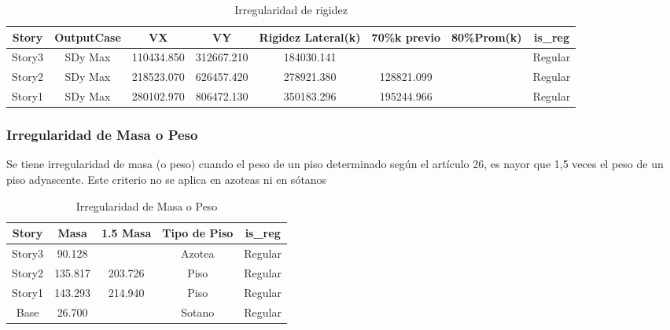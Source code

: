\documentclass{article}%
\begin{document}
%


\begin{table}[h!]%
\centering%
\caption{Irregularidad de rigidez}%
\begin{tabular}{cccccccc}
\toprule
Story & OutputCase & VX & VY & Rigidez Lateral(k) & 70\%k previo & 80\%Prom(k) & is\_reg \\
\midrule
Story3 & SDy Max & 110434.850 & 312667.210 & 184030.141 &  &  & Regular \\
Story2 & SDy Max & 218523.070 & 626457.420 & 278921.380 & 128821.099 &  & Regular \\
Story1 & SDy Max & 280102.970 & 806472.130 & 350183.296 & 195244.966 &  & Regular \\
\bottomrule
\end{tabular}
%
\end{table}

%
\subsubsection{Irregularidad de Masa o Peso}%
\label{ssubsec:IrregularidaddeMasaoPeso}%
\begin{tcolorbox}[colback=gray!5!white,colframe=cyan!75!black,fonttitle=\bfseries,title=Tabla N°9 E-030]%
Se tiene irregularidad de masa (o peso) cuando el peso de un piso determinado según el artículo 26, es nayor que 1,5 veces el peso de un piso adyascente. Este criterio no se aplica en azoteas ni en sótanos%
\end{tcolorbox}%


\begin{table}[h!]%
\centering%
\caption{Irregularidad de Masa o Peso}%
\begin{tabular}{ccccc}
\toprule
Story & Masa & 1.5 Masa & Tipo de Piso & is\_reg \\
\midrule
Story3 & 90.128 &  & Azotea & Regular \\
Story2 & 135.817 & 203.726 & Piso & Regular \\
Story1 & 143.293 & 214.940 & Piso & Regular \\
Base & 26.700 &  & Sotano & Regular \\
\bottomrule
\end{tabular}
%
\end{table}

%
\end{document}
